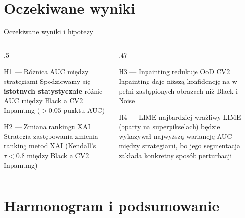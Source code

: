 \documentclass[aspectratio=169, 12pt]{beamer}
\begin{document}
\section{Oczekiwane wyniki}

\begin{frame}{Oczekiwane wyniki i hipotezy}
  \begin{columns}[T]
    \begin{column}{.5\textwidth}
      \begin{block}{H1 — Różnica AUC między strategiami}
        Spodziewamy się \textbf{istotnych statystycznie} różnic AUC
        między Black a CV2 Inpainting ($>0.05$ punktu AUC)
      \end{block}
      \vspace{6pt}
      \begin{block}{H2 — Zmiana rankingu XAI}
        Strategia zastępowania zmienia ranking metod XAI
        (Kendall's $\tau < 0.8$ między Black a CV2 Inpainting)
      \end{block}
    \end{column}
    \begin{column}{.47\textwidth}
      \begin{block}{H3 — Inpainting redukuje OoD}
        CV2 Inpainting daje niższą konfidencję na w pełni
        zastąpionych obrazach niż Black i Noise
      \end{block}
      \vspace{6pt}
      \begin{block}{H4 — LIME najbardziej wrażliwy}
        LIME (oparty na superpikselach) będzie wykazywał
        najwyższą wariancję AUC między strategiami,
        bo jego segmentacja zakłada konkretny sposób perturbacji
      \end{block}
    \end{column}
  \end{columns}
\end{frame}

\section{Harmonogram i podsumowanie}
\end{document}
